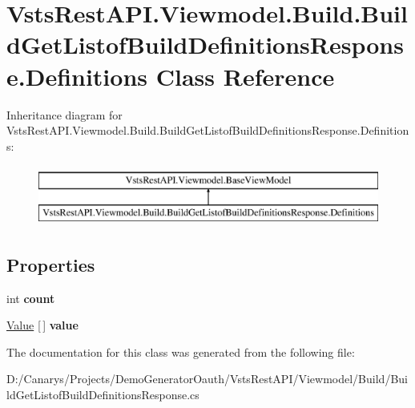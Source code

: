 \hypertarget{class_vsts_rest_a_p_i_1_1_viewmodel_1_1_build_1_1_build_get_listof_build_definitions_response_1_1_definitions}{}\section{Vsts\+Rest\+A\+P\+I.\+Viewmodel.\+Build.\+Build\+Get\+Listof\+Build\+Definitions\+Response.\+Definitions Class Reference}
\label{class_vsts_rest_a_p_i_1_1_viewmodel_1_1_build_1_1_build_get_listof_build_definitions_response_1_1_definitions}
Inheritance diagram for Vsts\+Rest\+A\+P\+I.\+Viewmodel.\+Build.\+Build\+Get\+Listof\+Build\+Definitions\+Response.\+Definitions\+:\begin{figure}[H]
\begin{center}
\leavevmode
\includegraphics[height=2.000000cm]{class_vsts_rest_a_p_i_1_1_viewmodel_1_1_build_1_1_build_get_listof_build_definitions_response_1_1_definitions}
\end{center}
\end{figure}
\subsection*{Properties}
\begin{DoxyCompactItemize}
\item 
\mbox{\label{class_vsts_rest_a_p_i_1_1_viewmodel_1_1_build_1_1_build_get_listof_build_definitions_response_1_1_definitions_ab80c2ddbb80ec387c275c67aed68b15c}} 
int {\bfseries count}
\item 
\mbox{\label{class_vsts_rest_a_p_i_1_1_viewmodel_1_1_build_1_1_build_get_listof_build_definitions_response_1_1_definitions_aa9315e4be59c2b63dd0db4cbe3fdda5f}} 
\mbox{\hyperlink{class_vsts_rest_a_p_i_1_1_viewmodel_1_1_build_1_1_build_get_listof_build_definitions_response_1_1_value}{Value}} \mbox{[}$\,$\mbox{]} {\bfseries value}
\end{DoxyCompactItemize}


The documentation for this class was generated from the following file\+:\begin{DoxyCompactItemize}
\item 
D\+:/\+Canarys/\+Projects/\+Demo\+Generator\+Oauth/\+Vsts\+Rest\+A\+P\+I/\+Viewmodel/\+Build/Build\+Get\+Listof\+Build\+Definitions\+Response.\+cs\end{DoxyCompactItemize}
